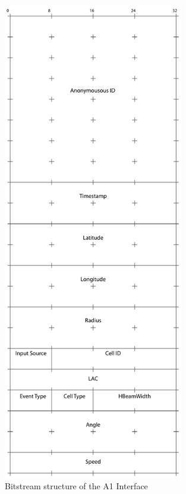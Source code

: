 \documentclass[master,english]{hgbthesis}
\begin{document}
\begin{figure}
	\centering
	\includegraphics[width=0.7\textwidth]{./images/datenstruktur}
	\caption{Bitstream structure of the A1 Interface}
	\label{fig:a1structure}
\end{figure}
\end{document}
